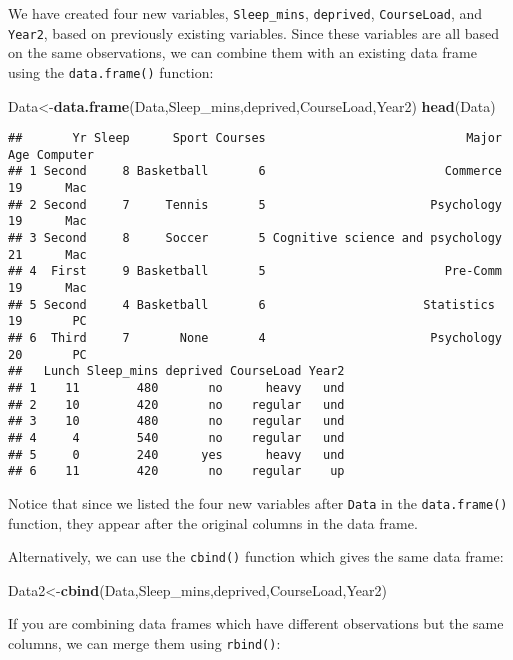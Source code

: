 \documentclass[
]{book}
\newenvironment{Shaded}{\begin{snugshade}}{\end{snugshade}}
\newcommand{\FunctionTok}[1]{\textcolor[rgb]{0.13,0.29,0.53}{\textbf{#1}}}
\newcommand{\NormalTok}[1]{#1}
\newcommand{\OtherTok}[1]{\textcolor[rgb]{0.56,0.35,0.01}{#1}}
\begin{document}
We have created four new variables, \texttt{Sleep\_mins}, \texttt{deprived}, \texttt{CourseLoad}, and \texttt{Year2}, based on previously existing variables. Since these variables are all based on the same observations, we can combine them with an existing data frame using the \texttt{data.frame()} function:

\begin{Shaded}
\begin{Highlighting}[]
\NormalTok{Data}\OtherTok{\textless{}{-}}\FunctionTok{data.frame}\NormalTok{(Data,Sleep\_mins,deprived,CourseLoad,Year2)}
\FunctionTok{head}\NormalTok{(Data)}
\end{Highlighting}
\end{Shaded}

\begin{verbatim}
##       Yr Sleep      Sport Courses                            Major Age Computer
## 1 Second     8 Basketball       6                         Commerce  19      Mac
## 2 Second     7     Tennis       5                       Psychology  19      Mac
## 3 Second     8     Soccer       5 Cognitive science and psychology  21      Mac
## 4  First     9 Basketball       5                         Pre-Comm  19      Mac
## 5 Second     4 Basketball       6                      Statistics   19       PC
## 6  Third     7       None       4                       Psychology  20       PC
##   Lunch Sleep_mins deprived CourseLoad Year2
## 1    11        480       no      heavy   und
## 2    10        420       no    regular   und
## 3    10        480       no    regular   und
## 4     4        540       no    regular   und
## 5     0        240      yes      heavy   und
## 6    11        420       no    regular    up
\end{verbatim}

Notice that since we listed the four new variables after \texttt{Data} in the \texttt{data.frame()} function, they appear after the original columns in the data frame.

Alternatively, we can use the \texttt{cbind()} function which gives the same data frame:

\begin{Shaded}
\begin{Highlighting}[]
\NormalTok{Data2}\OtherTok{\textless{}{-}}\FunctionTok{cbind}\NormalTok{(Data,Sleep\_mins,deprived,CourseLoad,Year2)}
\end{Highlighting}
\end{Shaded}

If you are combining data frames which have different observations but the same columns, we can merge them using \texttt{rbind()}:
\end{document}
